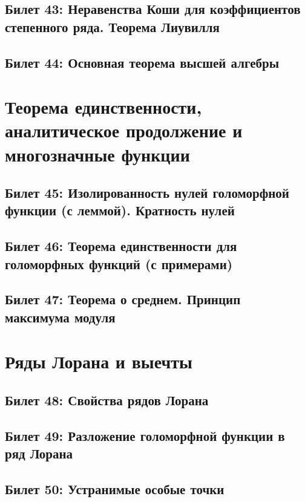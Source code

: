 \documentclass[12pt, a4paper, oneside]{memoir}
\begin{document}
\subsection{Билет 43: Неравенства Коши для коэффициентов степенного ряда. Теорема Лиувилля}

\subsection{Билет 44: Основная теорема высшей алгебры}




\section{Теорема единственности, аналитическое продолжение и многозначные функции}


\subsection{Билет 45: Изолированность нулей голоморфной функции (с леммой). Кратность нулей}

\subsection{Билет 46: Теорема единственности для голоморфных функций (с примерами)}

\subsection{Билет 47: Теорема о среднем. Принцип максимума модуля}




\section{Ряды Лорана и выечты}

\subsection{Билет 48: Свойства рядов Лорана}

\subsection{Билет 49: Разложение голоморфной функции в ряд Лорана}

\subsection{Билет 50: Устранимые особые точки}
\end{document}
